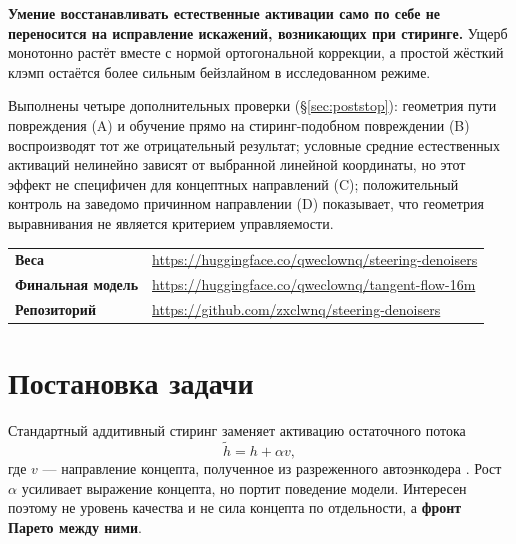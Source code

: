 \documentclass[10pt,a4paper]{article}
\begin{document}
\begin{tcolorbox}[colback=white,colframe=accent,boxrule=0.9pt,arc=1pt,
                  left=10pt,right=10pt,top=8pt,bottom=8pt]
\medskip
\textbf{Умение восстанавливать естественные активации само по себе не
переносится на исправление искажений, возникающих при стиринге.} Ущерб монотонно растёт вместе
с нормой ортогональной коррекции, а простой жёсткий клэмп остаётся более сильным
бейзлайном в исследованном режиме.

\smallskip
{\small Выполнены четыре дополнительных проверки (\S\ref{sec:poststop}):
геометрия пути повреждения (A) и обучение прямо на стиринг-подобном повреждении
(B) воспроизводят тот же отрицательный результат; условные средние естественных
активаций нелинейно зависят от выбранной линейной координаты, но этот эффект не
специфичен для концептных направлений (C); положительный контроль на заведомо
причинном направлении (D) показывает, что геометрия выравнивания не является
критерием управляемости.}
\end{tcolorbox}

\vspace{0.35cm}

\begin{center}
\small
\begin{tabular}{@{}ll@{}}
\textbf{Веса} & \url{https://huggingface.co/qweclownq/steering-denoisers}\\
\textbf{Финальная модель} & \url{https://huggingface.co/qweclownq/tangent-flow-16m}\\
\textbf{Репозиторий} & \url{https://github.com/zxclwnq/steering-denoisers}\\
\end{tabular}

\end{center}

\vfill

\clearpage
\tableofcontents
\clearpage

\section{Постановка задачи}

Стандартный аддитивный стиринг \cite{turner2023actadd,li2023iti} заменяет
активацию остаточного потока
\[
  \tilde h = h + \alpha v ,
\]
где $v$ — направление концепта, полученное из разреженного автоэнкодера
\cite{bricken2023monosemanticity,gao2024scalingsae}. Рост $\alpha$ усиливает
выражение концепта, но портит поведение модели. Интересен поэтому не уровень
качества и не сила концепта по отдельности, а \textbf{фронт Парето между ними}.
\end{document}

